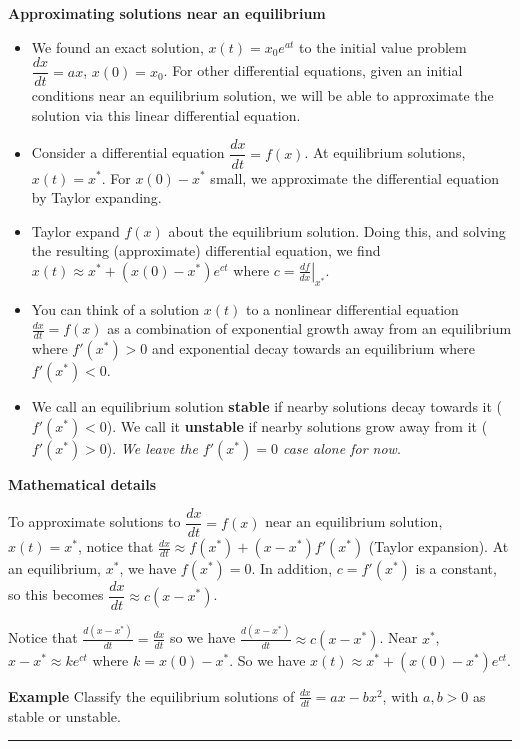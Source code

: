 \documentclass[12pt,letterpaper,noanswers]{exam}
\begin{document}
\noindent\textbf{Approximating solutions near an equilibrium}
\begin{tcolorbox}
\begin{itemize}
\itemsep0em
\item We found an exact solution, $x(t) = x_0e^{at}$ to the initial value problem $\dfrac{dx}{dt} = ax$, $x(0) = x_0$.  For other differential equations, given an initial conditions near an equilibrium solution, we will be able to approximate the solution via this linear differential equation.
    \item Consider a differential equation $\dfrac{dx}{dt} = f(x)$.  At equilibrium solutions, $x(t) = x^*$.  For $x(0) - x^*$ small, we approximate the differential equation by Taylor expanding.
    \item Taylor expand $f(x)$ about the equilibrium solution.  Doing this, and solving the resulting (approximate) differential equation, we find $x(t) \approx x^* + (x(0)-x^*)e^{ct}$ where $c = \left.\frac{df}{dx}\right\vert_{x^*}$.
    \item You can think of a solution $x(t)$ to a nonlinear differential equation $\frac{dx}{dt} = f(x)$ as a combination of exponential growth away from an equilibrium where $f'(x^*)>0$ and exponential decay towards an equilibrium where $f'(x^*)<0$.
    \item We call an equilibrium solution \textbf{stable} if nearby solutions decay towards it ($f'(x^*)<0$).  We call it \textbf{unstable} if nearby solutions grow away from it ($f'(x^*)>0$).  \emph{We leave the $f'(x^*) = 0$ case alone for now}.
\end{itemize}
\end{tcolorbox}
\noindent\textbf{Mathematical details}

     To approximate solutions to $\dfrac{dx}{dt} = f(x)$ near an equilibrium solution, $x(t) = x^*$, notice that $\frac{dx}{dt}\approx f(x^*) + (x-x^*)f'(x^*)$ (Taylor expansion).  At an equilibrium, $x^*$, we have $f(x^*) = 0$.  In addition, $c = f'(x^*)$ is a constant, so this becomes $\dfrac{dx}{dt} \approx c(x-x^*)$.
     
     Notice that $\frac{d(x-x^*)}{dt} = \frac{dx}{dt}$ so we have $\frac{d(x-x^*)}{dt}\approx c(x-x^*)$.  Near $x^*$, $x-x^* \approx ke^{ct}$ where $k = x(0) -x^*$.  So we have $x(t) \approx x^* + (x(0)-x^*)e^{ct}$.
     \vspace{2in}
     
     \noindent\textbf{Example}
     Classify the equilibrium solutions of $\frac{dx}{dt} = ax - bx^2$, with $a,b>0$ as stable or unstable.
     \vfill
    
    \vspace{0.2cm}
\hrule
\vspace{0.2cm}
\end{document}
